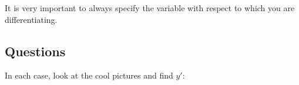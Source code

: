 It is very important to always specify the variable with respect to which you are differentiating.

\clearpage
\subsection*{Questions}
\begin{questions}
  \questioM In each case, look at the cool pictures and find $ y' $:
    \begin{multicols}{2}
\end{multicols}
\end{questions}
